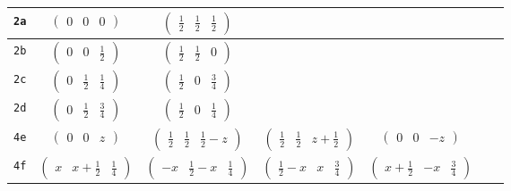 \documentclass[fleqn,9pt,landscape]{jsarticle}
\begin{document}
\begin{center}
\begin{longtable}{ccccccc}
{\tt 2a} & $ \begin{pmatrix} 0 & 0 & 0 \end{pmatrix} $ & $ \begin{pmatrix} \frac{1}{2} & \frac{1}{2} & \frac{1}{2} \end{pmatrix} $ & $  $ & $  $ & $  $ & $  $ \\ \hline
{\tt 2b} & $ \begin{pmatrix} 0 & 0 & \frac{1}{2} \end{pmatrix} $ & $ \begin{pmatrix} \frac{1}{2} & \frac{1}{2} & 0 \end{pmatrix} $ & $  $ & $  $ & $  $ & $  $ \\ \hline
{\tt 2c} & $ \begin{pmatrix} 0 & \frac{1}{2} & \frac{1}{4} \end{pmatrix} $ & $ \begin{pmatrix} \frac{1}{2} & 0 & \frac{3}{4} \end{pmatrix} $ & $  $ & $  $ & $  $ & $  $ \\ \hline
{\tt 2d} & $ \begin{pmatrix} 0 & \frac{1}{2} & \frac{3}{4} \end{pmatrix} $ & $ \begin{pmatrix} \frac{1}{2} & 0 & \frac{1}{4} \end{pmatrix} $ & $  $ & $  $ & $  $ & $  $ \\ \hline
{\tt 4e} & $ \begin{pmatrix} 0 & 0 & z \end{pmatrix} $ & $ \begin{pmatrix} \frac{1}{2} & \frac{1}{2} & \frac{1}{2} - z \end{pmatrix} $ & $ \begin{pmatrix} \frac{1}{2} & \frac{1}{2} & z + \frac{1}{2} \end{pmatrix} $ & $ \begin{pmatrix} 0 & 0 & - z \end{pmatrix} $ & $  $ & $  $ \\ \hline
{\tt 4f} & $ \begin{pmatrix} x & x + \frac{1}{2} & \frac{1}{4} \end{pmatrix} $ & $ \begin{pmatrix} - x & \frac{1}{2} - x & \frac{1}{4} \end{pmatrix} $ & $ \begin{pmatrix} \frac{1}{2} - x & x & \frac{3}{4} \end{pmatrix} $ & $ \begin{pmatrix} x + \frac{1}{2} & - x & \frac{3}{4} \end{pmatrix} $ & $  $ & $  $ \\ \hline

\end{longtable}
\end{center}
\end{document}
